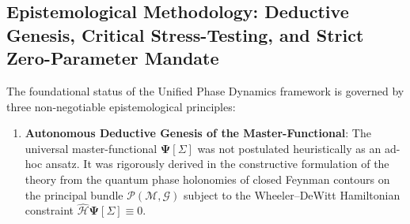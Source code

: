 \documentclass[11pt,a4paper]{article}
\theoremstyle{definition}
\begin{document}
\clearpage

\subsection{Epistemological Methodology: Deductive Genesis, Critical Stress-Testing, and Strict Zero-Parameter Mandate}

The foundational status of the Unified Phase Dynamics framework is governed by three non-negotiable epistemological principles:

\begin{enumerate}
\item \textbf{Autonomous Deductive Genesis of the Master-Functional}: The universal master-functional $\mathbf{\Psi}[\Sigma]$ was not postulated heuristically as an ad-hoc ansatz. It was rigorously derived in the constructive formulation of the theory from the quantum phase holonomies of closed Feynman contours on the principal bundle $\mathcal{P}(\mathcal{M}, \mathcal{G})$ subject to the Wheeler--DeWitt Hamiltonian constraint $\hat{\mathcal{H}} \mathbf{\Psi}[\Sigma] \equiv 0$.


\end{enumerate}
\end{document}
